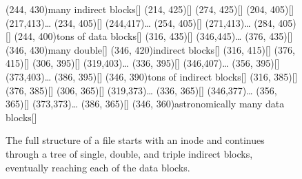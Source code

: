 \begin{figure}
{\begin{graph}
(244, 430){many indirect blocks}[]
(214, 425){}[]
(274, 425){}[]
(204, 405){}[]
\freetext(217,413){\ldots}
(234, 405){}[]
\freetext(244,417){\ldots}
(254, 405){}[]
\freetext(271,413){\ldots}
(284, 405){}[]
(244, 400){tons of data blocks}[]
(316, 435){}[]
\freetext(346,445){\ldots}
(376, 435){}[]
(346, 430){many double}[]
(346, 420){indirect blocks}[]
(316, 415){}[]
(376, 415){}[]
(306, 395){}[]
\freetext(319,403){\ldots}
(336, 395){}[]
\freetext(346,407){\ldots}
(356, 395){}[]
\freetext(373,403){\ldots}
(386, 395){}[]
(346, 390){tons of indirect blocks}[]
(316, 385){}[]
(376, 385){}[]
(306, 365){}[]
\freetext(319,373){\ldots}
(336, 365){}[]
\freetext(346,377){\ldots}
(356, 365){}[]
\freetext(373,373){\ldots}
(386, 365){}[]
(346, 360){astronomically many data blocks}[]
\end{graph}}
\fi
\caption{The full structure of a file starts with an inode and
continues through a tree of single, double, and triple indirect
blocks, eventually reaching each of the data blocks.}
\label{inode-block-tree}
\end{figure}

